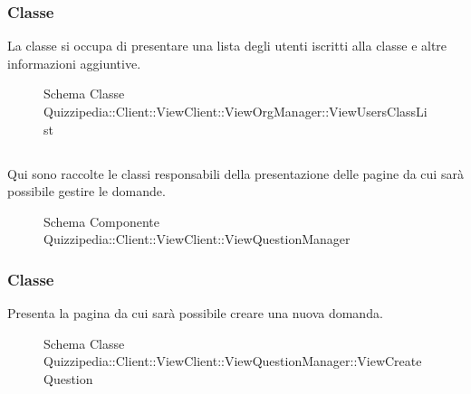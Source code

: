 \subsubsection{Classe }
La classe si occupa di presentare una lista degli utenti iscritti alla classe e altre informazioni aggiuntive.
\begin{figure}[H]
\centering
\noindent{}
\caption[Schema Classe ViewUsersClassList]{Schema Classe Quizzipedia::Client::ViewClient::ViewOrgManager::ViewUsersClassList}
\end{figure}
\subsection{}
Qui sono raccolte le classi responsabili della presentazione delle pagine da cui sarà possibile gestire le domande.
\begin{figure}[H]
\centering
\noindent{}
\caption[Schema Componente Quizzipedia::Client::ViewClient::ViewQuestionManager]{Schema Componente Quizzipedia::Client::ViewClient::ViewQuestionManager}
\end{figure}
\subsubsection{Classe }
Presenta la pagina da cui sarà possibile creare una nuova domanda.
\begin{figure}[H]
\centering
\noindent{}
\caption[Schema Classe ViewCreateQuestion]{Schema Classe Quizzipedia::Client::ViewClient::ViewQuestionManager::ViewCreateQuestion}
\end{figure}
